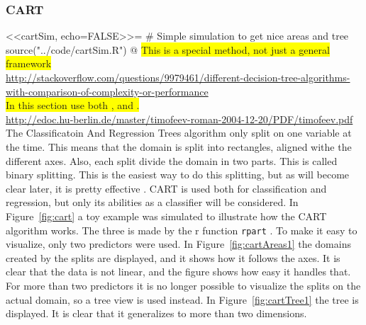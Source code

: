 \subsubsection{CART}
\label{subsub:CART}
<<cartSim, echo=FALSE>>=
# Simple simulation to get nice areas and tree
source("../code/cartSim.R")
@
\colorbox{yellow}{This is a special method, not just a general framework}\\
\url{http://stackoverflow.com/questions/9979461/different-decision-tree-algorithms-with-comparison-of-complexity-or-performance}\\
\colorbox{yellow}{In this section use both \cite{bishop} , \cite{modstat} and \cite{breiman}.}\\
\url{http://edoc.hu-berlin.de/master/timofeev-roman-2004-12-20/PDF/timofeev.pdf}\\
%
The Classificatoin And Regression Trees algorithm only split on one variable at the time. This means that the domain is split into rectangles, aligned withe the different axes. 
Also, each split divide the domain in two parts. This is called binary splitting. This is the easiest way to do this splitting, but as will become clear later, it is pretty effective . CART is used both for classification and regression, but only its abilities as a classifier will be considered.
In Figure~\ref{fig:cart} a toy example was simulated to illustrate how the CART algorithm works. The three is made by the r function \verb+rpart+ \cite{rpart}. To make it easy to visualize, only two predictors were used. In Figure~\ref{fig:cartAreas1} the domains created by the splits are displayed, and it shows how it follows the axes. It is clear that the data is not linear, and the figure shows how easy it handles that.
For more than two predictors it is no longer possible to visualize the splits on the actual domain, so a tree view is used instead.
 In Figure~\ref{fig:cartTree1} the tree is displayed. It is clear that it generalizes to more than two dimensions. \\
%
